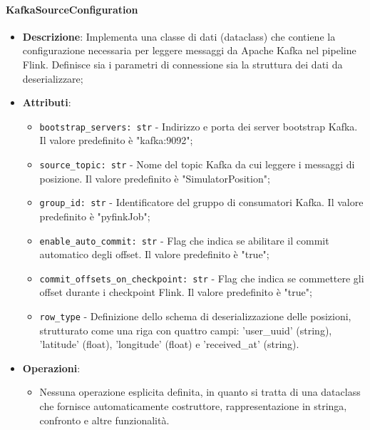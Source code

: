 \documentclass[10pt]{article}
\begin{document}
    \paragraph{KafkaSourceConfiguration}
    \begin{itemize} 
    \item \textbf{Descrizione}: Implementa una classe di dati (dataclass) che contiene la configurazione necessaria per leggere messaggi da Apache Kafka nel pipeline Flink. Definisce sia i parametri di connessione sia la struttura dei dati da deserializzare;
    \item \textbf{Attributi}:
    \begin{itemize}
        \item \texttt{bootstrap\_servers: str} - Indirizzo e porta dei server bootstrap Kafka. Il valore predefinito è "kafka:9092";
        \item \texttt{source\_topic: str} - Nome del topic Kafka da cui leggere i messaggi di posizione. Il valore predefinito è "SimulatorPosition";
        \item \texttt{group\_id: str} - Identificatore del gruppo di consumatori Kafka. Il valore predefinito è "pyfinkJob";
        \item \texttt{enable\_auto\_commit: str} - Flag che indica se abilitare il commit automatico degli offset. Il valore predefinito è "true";
        \item \texttt{commit\_offsets\_on\_checkpoint: str} - Flag che indica se commettere gli offset durante i checkpoint Flink. Il valore predefinito è "true";
        \item \texttt{row\_type} - Definizione dello schema di deserializzazione delle posizioni, strutturato come una riga con quattro campi: 'user\_uuid' (string), 'latitude' (float), 'longitude' (float) e 'received\_at' (string).
    \end{itemize}
    
    \item \textbf{Operazioni}:
    \begin{itemize}
        \item Nessuna operazione esplicita definita, in quanto si tratta di una dataclass che fornisce automaticamente costruttore, rappresentazione in stringa, confronto e altre funzionalità.
    \end{itemize}
    \end{itemize}
    
\end{document}
